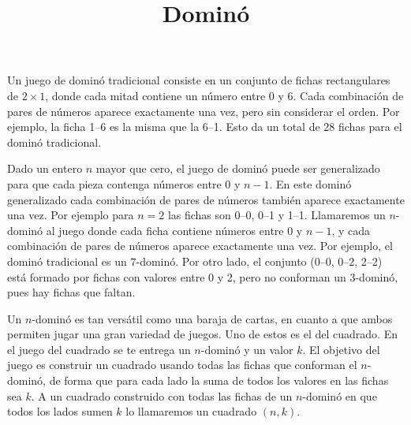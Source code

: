 \documentclass{oci}
\title{Dominó}
\begin{document}
\maketitle
Un juego de dominó tradicional consiste en un conjunto de fichas rectangulares de $2\times1$, donde cada mitad contiene un número entre 0 y $6$. 
Cada combinación de pares de números aparece exactamente una vez, pero sin considerar el orden.
Por ejemplo, la ficha 1--6 es la misma que la 6--1.
Esto da un total de 28 fichas para el dominó tradicional.

Dado un entero $n$ mayor que cero, el juego de dominó puede ser generalizado para que cada pieza contenga números entre 0 y $n-1$.
En este dominó generalizado cada combinación de pares de números también aparece exactamente una vez.
Por ejemplo para $n=2$ las fichas son 0--0, 0--1 y 1--1.
Llamaremos un $n$-dominó al juego donde cada ficha contiene números entre 0 y $n-1$, y cada combinación de pares de números aparece exactamente una vez.
Por ejemplo, el dominó tradicional es un $7$-dominó.
Por otro lado, el conjunto (0--0, 0--2, 2--2) está formado por fichas con valores entre 0 y 2, pero no conforman un 3-dominó, pues hay fichas que faltan.

Un $n$-dominó es tan versátil como una baraja de cartas, en cuanto a que ambos permiten jugar una gran variedad de juegos.
Uno de estos es el del cuadrado. %
En el juego del cuadrado se te entrega un $n$-dominó y un valor $k$.
El objetivo del juego es construir un cuadrado usando todas las fichas que conforman el $n$-dominó, de forma que para cada lado la suma de todos los valores en las fichas sea $k$.
A un cuadrado construido con todas las fichas de un $n$-dominó en que todos los lados sumen $k$ lo llamaremos un cuadrado $(n,k)$.
\end{document}
